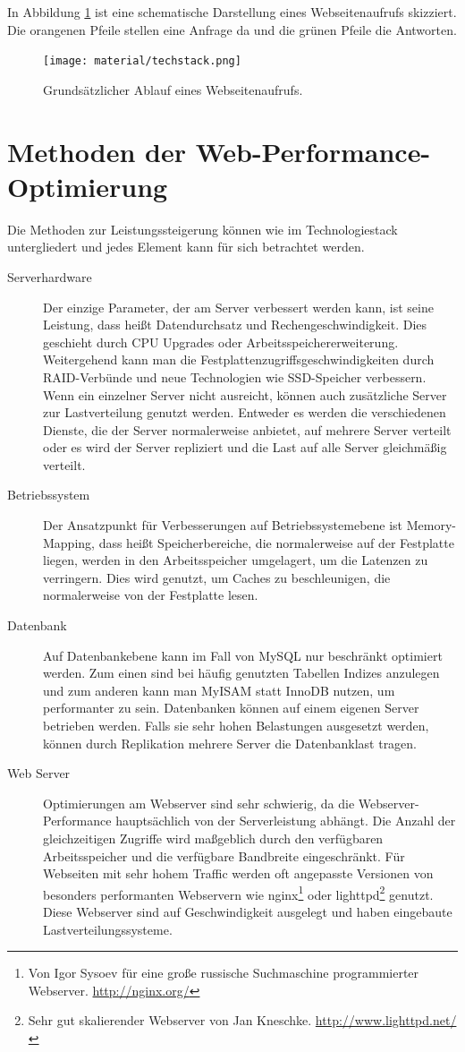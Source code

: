 In Abbildung \ref{fig:techstack} ist eine schematische Darstellung eines Webseitenaufrufs skizziert. Die orangenen Pfeile stellen eine Anfrage da und die gr\"unen Pfeile die Antworten.
\begin{figure}[!ht]
  \centering
  \texttt{[image: material/techstack.png]}
  \caption{Grunds\"atzlicher Ablauf eines Webseitenaufrufs.}
  \label{fig:techstack}
\end{figure}

\section{Methoden der Web-Performance-Optimierung}
Die Methoden zur Leistungssteigerung können wie im Technologiestack untergliedert und jedes Element kann für sich betrachtet werden.

\begin{description}
  \item[Serverhardware] Der einzige Parameter, der am Server verbessert werden kann, ist seine Leistung, dass heißt Datendurchsatz und Rechengeschwindigkeit. Dies geschieht durch CPU Upgrades oder Arbeitsspeichererweiterung. Weitergehend kann man die Festplattenzugriffsgeschwindigkeiten durch RAID-Verbünde und neue Technologien wie SSD-Speicher verbessern. Wenn ein einzelner Server nicht ausreicht, k\"onnen auch zus\"atzliche Server zur Lastverteilung genutzt werden. Entweder es werden die verschiedenen Dienste, die der Server normalerweise anbietet, auf mehrere Server verteilt oder es wird der Server repliziert und die Last auf alle Server gleichm\"a\ss{}ig verteilt.
  \item[Betriebssystem] Der Ansatzpunkt für Verbesserungen auf Betriebssystemebene ist Memory-Mapping, dass heißt Speicherbereiche, die normalerweise auf der Festplatte liegen, werden in den Arbeitsspeicher umgelagert, um die Latenzen zu verringern. Dies wird genutzt, um Caches zu beschleunigen, die normalerweise von der Festplatte lesen.
  \item[Datenbank] Auf Datenbankebene kann im Fall von MySQL nur beschränkt optimiert werden. Zum einen sind bei häufig genutzten Tabellen Indizes anzulegen und zum anderen kann man MyISAM statt InnoDB nutzen, um performanter zu sein. Datenbanken k\"onnen auf einem eigenen Server betrieben werden. Falls sie sehr hohen Belastungen ausgesetzt werden, k\"onnen durch Replikation mehrere Server die Datenbanklast tragen.
  \item[Web Server] Optimierungen am Webserver sind sehr schwierig, da die Webserver-Performance hauptsächlich von der Serverleistung abhängt. Die Anzahl der gleichzeitigen Zugriffe wird maßgeblich durch den verfügbaren Arbeitsspeicher und die verfügbare Bandbreite eingeschränkt. F\"ur Webseiten mit sehr hohem Traffic werden oft angepasste Versionen von besonders performanten Webservern wie nginx\footnote{Von Igor Sysoev f\"ur eine gro\ss{}e russische Suchmaschine programmierter Webserver. \url{http://nginx.org/}} oder lighttpd\footnote{Sehr gut skalierender Webserver von Jan Kneschke. \url{http://www.lighttpd.net/}} genutzt. Diese Webserver sind auf Geschwindigkeit ausgelegt und haben eingebaute Lastverteilungssysteme.

\end{description}
